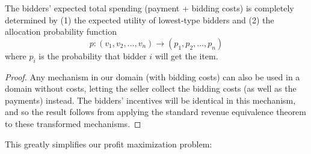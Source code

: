\begin{theorem}\label{theorem:equivalence}
The bidders' expected total spending (payment + bidding costs)
is completely determined by (1) the expected utility of
lowest-type bidders and (2) the allocation probability function
$$p: (v_1, v_2, \ldots, v_n) \rightarrow (p_1, p_2, \ldots, p_n)$$ 
where $p_i$ is the probability that bidder $i$ will get the item.
\end{theorem}
\begin{proof}
  Any mechanism in our domain (with bidding costs) can also be used in a
  domain without costs, letting the seller collect the bidding costs (as
  well as the payments) instead.  The bidders' incentives will be identical
  in this mechanism, and so the result follows from applying the
  standard revenue equivalence theorem to these transformed mechanisms.
\end{proof}


This greatly simplifies our profit maximization problem:

